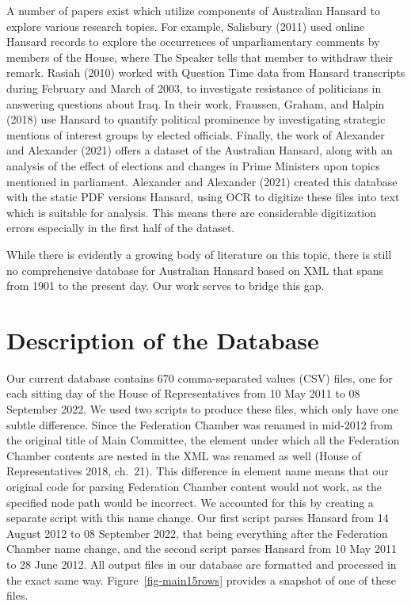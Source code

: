 \documentclass[
  letterpaper,
  DIV=11,
  numbers=noendperiod]{scrartcl}
\begin{document}
A number of papers exist which utilize components of Australian Hansard
to explore various research topics. For example, Salisbury (2011) used
online Hansard records to explore the occurrences of unparliamentary
comments by members of the House, where The Speaker tells that member to
withdraw their remark. Rasiah (2010) worked with Question Time data from
Hansard transcripts during February and March of 2003, to investigate
resistance of politicians in answering questions about Iraq. In their
work, Fraussen, Graham, and Halpin (2018) use Hansard to quantify
political prominence by investigating strategic mentions of interest
groups by elected officials. Finally, the work of Alexander and
Alexander (2021) offers a dataset of the Australian Hansard, along with
an analysis of the effect of elections and changes in Prime Ministers
upon topics mentioned in parliament. Alexander and Alexander (2021)
created this database with the static PDF versions Hansard, using OCR to
digitize these files into text which is suitable for analysis. This
means there are considerable digitization errors especially in the first
half of the dataset.

While there is evidently a growing body of literature on this topic,
there is still no comprehensive database for Australian Hansard based on
XML that spans from 1901 to the present day. Our work serves to bridge
this gap.

\hypertarget{sec-description}{%
\section{Description of the Database}\label{sec-description}}

Our current database contains 670 comma-separated values (CSV) files,
one for each sitting day of the House of Representatives from 10 May
2011 to 08 September 2022. We used two scripts to produce these files,
which only have one subtle difference. Since the Federation Chamber was
renamed in mid-2012 from the original title of Main Committee, the
element under which all the Federation Chamber contents are nested in
the XML was renamed as well (House of Representatives 2018, ch.~21).
This difference in element name means that our original code for parsing
Federation Chamber content would not work, as the specified node path
would be incorrect. We accounted for this by creating a separate script
with this name change. Our first script parses Hansard from 14 August
2012 to 08 September 2022, that being everything after the Federation
Chamber name change, and the second script parses Hansard from 10 May
2011 to 28 June 2012. All output files in our database are formatted and
processed in the exact same way. Figure~\ref{fig-main15rows} provides a
snapshot of one of these files.
\end{document}
